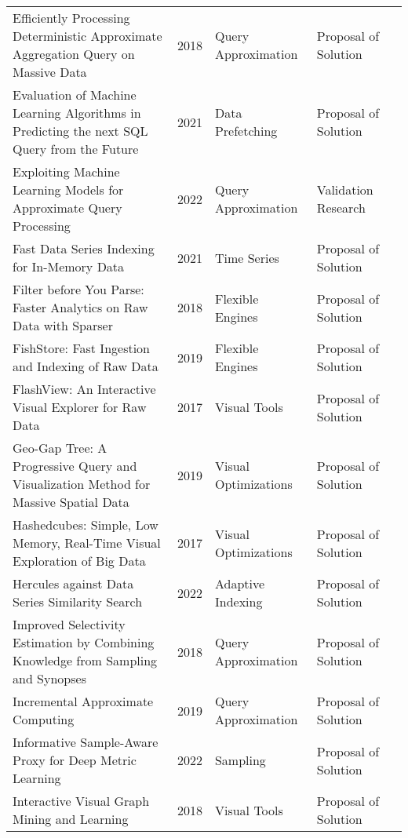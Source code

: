 \begin{longtable}{p{18em} l l l l}
Efficiently Processing Deterministic Approximate Aggregation Query on Massive Data & 2018 & Query Approximation & Proposal of Solution & \cite{han_efficiently_2018}\\ 
Evaluation of Machine Learning Algorithms in Predicting the next {{SQL}} Query from the Future & 2021 & Data Prefetching & Proposal of Solution & \cite{meduri_evaluation_2021}\\ 
Exploiting Machine Learning Models for Approximate Query Processing & 2022 & Query Approximation & Validation Research & \cite{lee_exploiting_2022}\\ 
Fast Data Series Indexing for In-Memory Data & 2021 & Time Series & Proposal of Solution & \cite{peng_fast_2021}\\ 
Filter before You Parse: {{Faster}} Analytics on Raw Data with Sparser & 2018 & Flexible Engines & Proposal of Solution & \cite{palkar_filter_2018}\\ 
{{FishStore}}: {{Fast}} Ingestion and Indexing of Raw Data & 2019 & Flexible Engines & Proposal of Solution & \cite{chandramouli_fishstore_2019}\\ 
{{FlashView}}: {{An}} Interactive Visual Explorer for Raw Data & 2017 & Visual Tools & Proposal of Solution & \cite{pang_flashview_2017}\\ 
Geo-Gap Tree: {{A}} Progressive Query and Visualization Method for Massive Spatial Data & 2019 & Visual Optimizations & Proposal of Solution & \cite{xiong_geogap_2019}\\ 
Hashedcubes: {{Simple}}, Low Memory, Real-Time Visual Exploration of Big Data & 2017 & Visual Optimizations & Proposal of Solution & \cite{pahins_hashedcubes_2017}\\ 
Hercules against Data Series Similarity Search & 2022 & Adaptive Indexing & Proposal of Solution & \cite{echihabi_hercules_2022}\\ 
Improved Selectivity Estimation by Combining Knowledge from Sampling and Synopses & 2018 & Query Approximation & Proposal of Solution & \cite{muller_improved_2018}\\ 
Incremental {{Approximate Computing}} & 2019 & Query Approximation & Proposal of Solution & \cite{quoc_incremental_2019}\\ 
Informative Sample-Aware Proxy for Deep Metric Learning & 2022 & Sampling & Proposal of Solution & \cite{li_informative_2022}\\ 
Interactive Visual Graph Mining and Learning & 2018 & Visual Tools & Proposal of Solution & \cite{rossi_interactive_2018}\\ 

\end{longtable}

